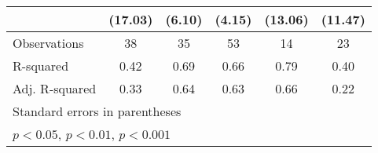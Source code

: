 {\begin{tabular}{l*{5}{c}}
                    &     (17.03)         &      (6.10)         &      (4.15)         &     (13.06)         &     (11.47)         \\
\midrule
Observations        &          38         &          35         &          53         &          14         &          23         \\
R-squared           &        0.42         &        0.69         &        0.66         &        0.79         &        0.40         \\
Adj. R-squared      &        0.33         &        0.64         &        0.63         &        0.66         &        0.22         \\
\bottomrule
\multicolumn{6}{l}{\footnotesize Standard errors in parentheses}\\
\multicolumn{6}{l}{\footnotesize \sym{*} \(p<0.05\), \sym{**} \(p<0.01\), \sym{***} \(p<0.001\)}\\
\end{tabular}
}
